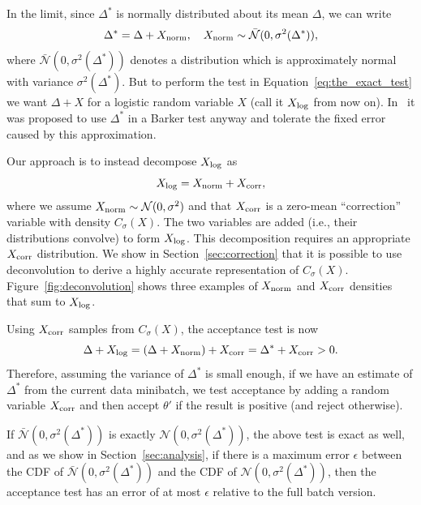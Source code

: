\documentclass{article}
\begin{document}
In the limit, since $\Delta^*$ is normally distributed about its mean $\Delta$,
we can write
\begin{equation}\label{eq:relationship}
    \Delta^* = \Delta + X_{\rm norm}, \quad X_{\rm norm} \sim \mathcal{\bar{N}}(0, \sigma^2(\Delta^*)),
\end{equation}
where $\mathcal{\bar{N}}(0, \sigma^2(\Delta^*))$ denotes a distribution which is
approximately normal with variance $\sigma^2(\Delta^*)$.  But to perform the
test in Equation~\ref{eq:the_exact_test} we want $\Delta + X$ for a logistic
random variable $X$ (call it $X_{\rm log}$ from now on). In~\cite{Bardenet15} it
was proposed to use $\Delta^*$ in a Barker test anyway and tolerate the fixed
error caused by this approximation. 

Our approach is to instead decompose $X_{\rm log}$ as
\begin{equation}\label{eq:deconvolution}
    X_{\rm log} = X_{\rm norm}+X_{\rm corr},
\end{equation}
where we assume $X_{\rm norm} \sim \mathcal{N}(0, \sigma^2)$ and that $X_{\rm
corr}$ is a zero-mean ``correction'' variable with density $C_{\sigma}(X)$.  The
two variables are added (i.e., their distributions convolve) to form $X_{\rm
log}$.  This decomposition requires an appropriate $X_{\rm corr}$ distribution.
We show in Section~\ref{sec:correction} that it is possible to use deconvolution
to derive a highly accurate representation of $C_\sigma(X)$.
Figure~\ref{fig:deconvolution} shows three examples of $X_{\rm norm}$ and
$X_{\rm corr}$ densities that sum to $X_{\rm log}$.

Using $X_{\rm corr}$ samples from $C_\sigma(X)$, the acceptance test is now
\begin{equation}\label{eq:criteria}
    \Delta + X_{\rm log} = (\Delta + X_{\rm norm}) + X_{\rm corr} = \Delta^* + X_{\rm corr} >0.
\end{equation}
Therefore, assuming the variance of $\Delta^*$ is small enough, if we have an
estimate of $\Delta^*$ from the current data minibatch, we test acceptance by
adding a random variable $X_{\rm corr}$ and then accept $\theta'$ if the result
is positive (and reject otherwise).

If $\mathcal{\bar{N}}(0, \sigma^2(\Delta^*))$ is exactly $\mathcal{N}(0,
\sigma^2(\Delta^*))$, the above test is exact as well, and as we show in
Section~\ref{sec:analysis}, if there is a maximum error $\epsilon$ between the
CDF of $\mathcal{\bar{N}}(0, \sigma^2(\Delta^*))$ and the CDF of $\mathcal{N}(0,
\sigma^2(\Delta^*))$, then the acceptance test has an error of at most
$\epsilon$ relative to the full batch version.
\end{document}
